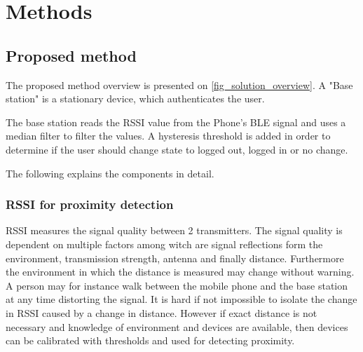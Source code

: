 \section{Methods}


\subsection{Proposed method}

The proposed method overview is presented on \cref{fig_solution_overview}. A "Base station" is a stationary device, which authenticates the user.

The base station reads the RSSI value from the Phone's BLE signal and uses a median filter to filter the values. A hysteresis threshold is added in order to determine if the user should change state to logged out, logged in or no change.

The following explains the components in detail.

\subsubsection{RSSI for proximity detection}

RSSI measures the signal quality between 2 transmitters.
The signal quality is dependent on multiple factors among witch are signal reflections form the environment, transmission strength, antenna and finally distance\cite{ref:rssidistance}.
Furthermore the environment in which the distance is measured may change without warning.
A person may for instance walk between the mobile phone and the base station at any time distorting the signal.
It is hard if not impossible to isolate the change in RSSI caused by a change in distance.
However if exact distance is not necessary and knowledge of environment and devices are available, then devices can be calibrated with thresholds and used for detecting proximity.


